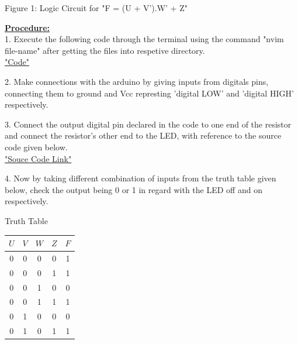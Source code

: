 \documentclass[10pt,a4paper]{report}
\begin{document}
\begin{multicols}{2}
\centering Figure 1: Logic Circuit for "F = (U + V').W' + Z" \vspace{15mm}
\\ \raggedright \large \textbf{\underline{Procedure:}} \normalsize \vspace{2mm}
\\ 1. Execute the following code through the terminal using the command "nvim file-name" after getting the files into respetive directory.
\\ \centering \underline{\href{https://github.com/BoleManideep/FWC_module1/tree/main/Assignments/ide/codes}{"Code"}} \vspace{2mm}
\\ \raggedright 2. Make connections with the arduino by giving inputs from digitals pins, connecting them to ground and Vcc represting 'digital LOW' and 'digital HIGH' respectively. \vspace{2mm} 
\\ \raggedright 3. Connect the output digital pin declared in the code to one end of the resistor and connect the resistor's other end to the LED, with reference to the source code given below. \vspace{2mm}
\\ \centering \underline{\href{https://github.com/BoleManideep/FWC_module1/blob/main/Assignments/ide/codes/src/main.cpp}{"Souce Code Link"}} \vspace{2mm}
\\ \raggedright 4. Now by taking different combination of inputs from the truth table given below, check the output being 0 or 1 in regard with the LED off and on respectively. \vspace{5mm}
\\ \begin{center}
	Truth Table \vspace{2mm} \\
    \setlength{\arrayrulewidth}{0.5mm}\setlength{\tabcolsep}{18pt}
\renewcommand{\arraystretch}{1.5}
    \begin{tabular}{|c|c|c|c|c|}
    \hline 
    \textbf{$U$} & \textbf{$V$} & \textbf{$W$} & \textbf{$Z$} & \textbf{$F$}\\
      \hline
      0 & 0 & 0 & 0 & 1\\
      0 & 0 & 0 & 1 & 1\\
      0 & 0 & 1 & 0 & 0\\
      0 & 0 & 1 & 1 & 1\\
      0 & 1 & 0 & 0 & 0\\
      0 & 1 & 0 & 1 & 1\\

\end{tabular}
\end{center}
\end{multicols}
\end{document}
